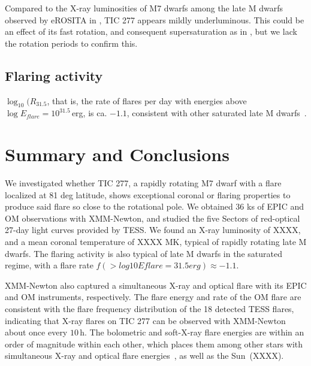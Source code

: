 \documentclass[twocolumn]{aastex631}
\begin{document}
\cite{brown2023coronal}

\cite{johnstone2012soft}

Compared to the X-ray luminosities of M7 dwarfs among the late M dwarfs observed by eROSITA in \citet{stelzer2022first}, TIC 277 appears mildly underluminous. This could be an effect of its fast rotation, and consequent supersaturation as in \citet{magaudda2022first}, but we lack the rotation periods to confirm this.


\subsection{Flaring activity}
\label{sec:discussion:flares}

$\log_10(R_{31.5}$, that is, the rate of flares per day with energies above $\log E_{flare}=10^{31.5}\,$erg, is ca. $-1.1$, consistent with other saturated late M dwarfs~\citep{medina2020flare, murray2022study}. 

 











\section{Summary and Conclusions}
We investigated whether TIC 277, a rapidly rotating M7 dwarf with a flare localized at 81 deg latitude, shows exceptional coronal or flaring properties to produce said flare so close to the rotational pole. We obtained 36 ks of EPIC and OM observations with XMM-Newton, and studied the five Sectors of red-optical 27-day light curves provided by TESS. We found an X-ray luminosity of XXXX, and a mean coronal temperature of XXXX MK, typical of rapidly rotating late M dwarfs. The flaring activity is also typical of late M dwarfs in the saturated regime, with a flare rate $f(> log 10 Eflare = 31.5 erg)\approx -1.1$. 

XMM-Newton also captured a simultaneous X-ray and optical flare with its EPIC and OM instruments, respectively. The flare energy and rate of the OM flare are consistent with the flare frequency distribution of the 18 detected TESS flares, indicating that X-ray flares on TIC 277 can be observed with XMM-Newton about once every $10\,$h. The bolometric and soft-X-ray flare energies are within an order of magnitude within each other, which places them among other stars with simultaneous X-ray and optical flare energies~\citep{guarcello2019simultaneous, kuznetsov2021stellar}, as well as the Sun~(XXXX).
\end{document}
